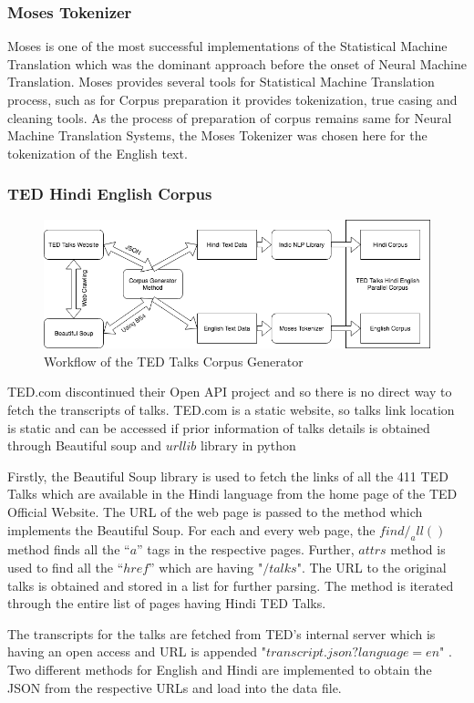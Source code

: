 \subsubsection{Moses Tokenizer}
Moses is one of the most successful implementations of the Statistical Machine Translation which was the dominant approach before the onset of Neural Machine Translation. Moses provides several tools for Statistical Machine Translation process, such as for Corpus preparation it provides tokenization, true casing and cleaning tools. As the process of preparation of corpus remains same for Neural Machine Translation Systems, the Moses Tokenizer was chosen here for the tokenization of the English text. 
\subsubsection{TED Hindi English Corpus}
\begin{figure}
\includegraphics[width=\textwidth]{figures/traindataworkflow.png}
\caption{Workflow of the TED Talks Corpus Generator} \label{fig1}
\end{figure}
TED.com discontinued their Open API project and so there is no direct way to fetch the transcripts of talks. TED.com is a static website, so talks link location is static and can be accessed if prior information of talks details is obtained through Beautiful soup and $urllib$ library in python 

Firstly, the Beautiful Soup library is used to fetch the links of all the 411 TED Talks which are available in the Hindi language from the home page of the TED Official Website. The URL of the web page is passed to the method which implements the Beautiful Soup.  For each and every web page, the $find/_all()$ method finds all the “$a$” tags in the respective pages. Further, $attrs$ method is used to find all the $“href”$ which are having "$/talks$". The URL to the original talks is obtained and stored in a list for further parsing. The method is iterated through the entire list of pages having Hindi TED Talks. 

The transcripts for the talks are fetched from TED’s internal server which is having an open access and URL is appended "$transcript.json?language=en$" . Two different methods for English and Hindi are implemented to obtain the JSON from the respective URLs and load into the data file. 

